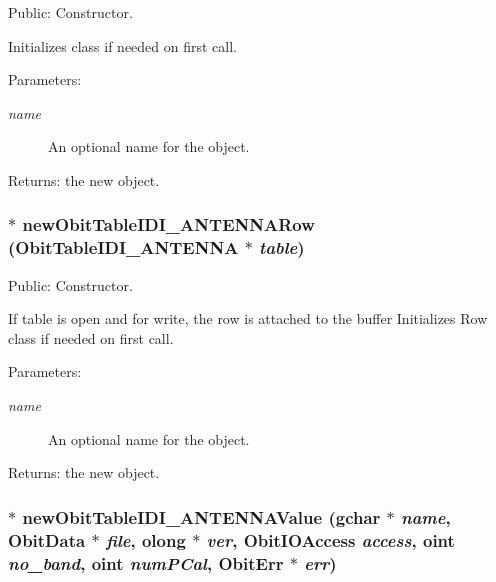 Public: Constructor. 

Initializes class if needed on first call. \begin{Desc}
\item[Parameters:]
\begin{description}
\item[{\em name}]An optional name for the object. \end{description}
\end{Desc}
\begin{Desc}
\item[Returns:]the new object. \end{Desc}
\subsubsection{$\ast$ new\-Obit\-Table\-IDI\_\-ANTENNARow ({\bf Obit\-Table\-IDI\_\-ANTENNA} $\ast$ {\em table})}\label{ObitTableIDI__ANTENNA_8h_a8}


Public: Constructor. 

If table is open and for write, the row is attached to the buffer Initializes Row class if needed on first call. \begin{Desc}
\item[Parameters:]
\begin{description}
\item[{\em name}]An optional name for the object. \end{description}
\end{Desc}
\begin{Desc}
\item[Returns:]the new object. \end{Desc}
\subsubsection{$\ast$ new\-Obit\-Table\-IDI\_\-ANTENNAValue (gchar $\ast$ {\em name}, {\bf Obit\-Data} $\ast$ {\em file}, {\bf olong} $\ast$ {\em ver}, Obit\-IOAccess {\em access}, {\bf oint} {\em no\_\-band}, {\bf oint} {\em num\-PCal}, {\bf Obit\-Err} $\ast$ {\em err})}\label{ObitTableIDI__ANTENNA_8h_a12}



